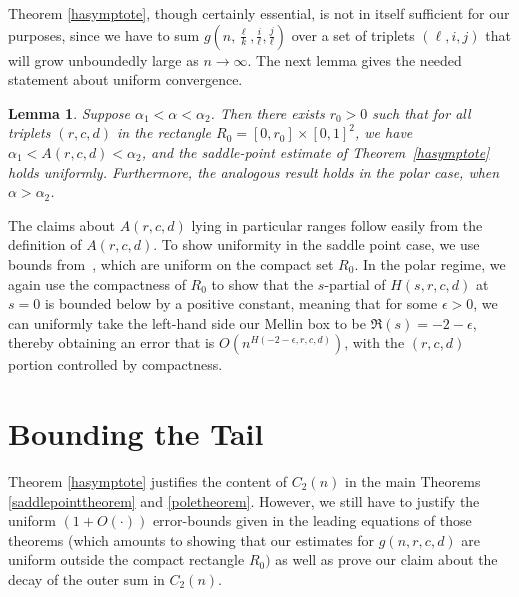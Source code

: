 \documentclass[proceedings]{aofa}
\newtheorem{lemma}{Lemma}
\begin{document}
Theorem \ref{hasymptote}, though certainly essential, is not in itself sufficient for our purposes, since we have to sum $g(n,\frac{\ell}{k},\frac{i}{\ell},\frac{j}{\ell})$ over a set of triplets $(\ell,i,j)$ that will grow unboundedly large as $n \rightarrow \infty$. The next lemma gives the needed statement about uniform convergence.
\begin{lemma}\label{uniformlemma}
Suppose $\alpha_{1} < \alpha < \alpha_{2}$. Then there exists $r_{0} > 0$ such that for all triplets $(r,c,d)$ in the rectangle $R_{0}=[0,r_{0}]\times [0,1]^{2}$, we have $\alpha_{1} < A(r,c,d) < \alpha_{2}$, and the saddle-point estimate of Theorem~\ref{hasymptote} holds uniformly. Furthermore, the analogous result holds in the polar case, when $\alpha > \alpha_{2}$.
\end{lemma}
The claims about $A(r,c,d)$ lying in particular ranges follow easily from the definition of $A(r,c,d)$. To show uniformity in the saddle point case, we use bounds from~\cite{Olver}, which are uniform on the compact set $R_{0}$. In the polar regime, we again use the compactness of $R_{0}$ to show that the $s$-partial of $H(s,r,c,d)$ at $s=0$ is bounded below by a positive constant, meaning that for some $\epsilon>0$, we can uniformly take the left-hand side our Mellin box to be $\Re(s)=-2-\epsilon$, thereby obtaining an error that is $O(n^{H(-2-\epsilon,r,c,d)})$, with the $(r,c,d)$ portion controlled by compactness.


\section{Bounding the Tail}\label{tailsection}
Theorem \ref{hasymptote} justifies the content of $C_{2}(n)$ in the main Theorems \ref{saddlepointtheorem} and \ref{poletheorem}. However, we still have to justify the uniform $(1+O(\cdot))$ error-bounds given in the leading equations of those theorems (which amounts to showing that our estimates for $g(n,r,c,d)$ are uniform outside the compact rectangle $R_{0})$ as well as prove our claim about the decay of the outer sum in $C_{2}(n)$. 
\end{document}
